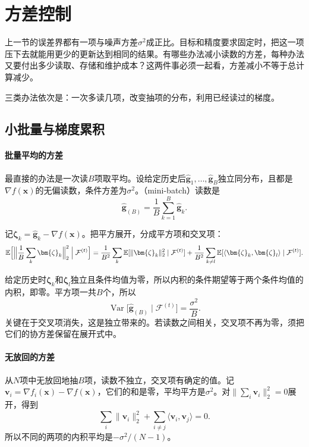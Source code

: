 \section{方差控制}
\label{sec:sgd-variance}

上一节的误差界都有一项与噪声方差$\sigma^2$成正比。目标和精度要求固定时，把这一项压下去就能用更少的更新达到相同的结果。有哪些办法减小读数的方差，每种办法又要付出多少读取、存储和维护成本？这两件事必须一起看，方差减小不等于总计算减少。

三类办法依次是：一次多读几项，改变抽项的分布，利用已经读过的梯度。

\subsection{小批量与梯度累积}
\label{sec:sgd-minibatch}

\paragraph{批量平均的方差}
最直接的办法是一次读$B$项取平均。设给定历史后$\hat{\bm{g}}_1,\ldots,\hat{\bm{g}}_B$独立同分布，且都是$\nabla f(\bm{x})$的无偏读数，条件方差为$\sigma^2$。（mini-batch）读数是
\begin{equation}
 \hat{\bm{g}}_{(B)}=\frac{1}{B}\sum_{k=1}^{B}\hat{\bm{g}}_k.
 \label{eq:sgd-minibatch}
\end{equation}

记$\bm{\zeta}_k=\hat{\bm{g}}_k-\nabla f(\bm{x})$。把平方展开，分成平方项和交叉项：
\[
 \mathbb{E}\Bigl[\Bigl\lVert\frac{1}{B}\sum_{k}\bm{\zeta}_k\Bigr\rVert_2^2\;\Big|\;\mathcal{F}^{(t)}\Bigr]
 =\frac{1}{B^2}\sum_{k}\mathbb{E}[\lVert\bm{\zeta}_k\rVert_2^2\mid\mathcal{F}^{(t)}]+\frac{1}{B^2}\sum_{k\neq l}\mathbb{E}[\langle\bm{\zeta}_k,\bm{\zeta}_l\rangle\mid\mathcal{F}^{(t)}].
\]

给定历史时$\bm{\zeta}_k$和$\bm{\zeta}_l$独立且条件均值为零，所以内积的条件期望等于两个条件均值的内积，即零。平方项一共$B$个，所以
\begin{equation}
 \operatorname{Var}\bigl[\hat{\bm{g}}_{(B)}\mid\mathcal{F}^{(t)}\bigr]=\frac{\sigma^2}{B}.
 \label{eq:sgd-minibatch-variance}
\end{equation}
关键在于交叉项消失，这是独立带来的。若读数之间相关，交叉项不再为零，须把它们的协方差保留在展开式中。

\paragraph{无放回的方差}
从$N$项中无放回地抽$B$项，读数不独立，交叉项有确定的值。记$\bm{v}_i=\nabla f_i(\bm{x})-\nabla f(\bm{x})$，它们的和是零，平均平方是$\sigma^2$。对$\lVert\sum_i\bm{v}_i\rVert_2^2=0$展开，得到
\[
 \sum_{i}\lVert\bm{v}_i\rVert_2^2+\sum_{i\neq j}\langle\bm{v}_i,\bm{v}_j\rangle=0.
\]
所以不同的两项的内积平均是$-\sigma^2/(N-1)$。

